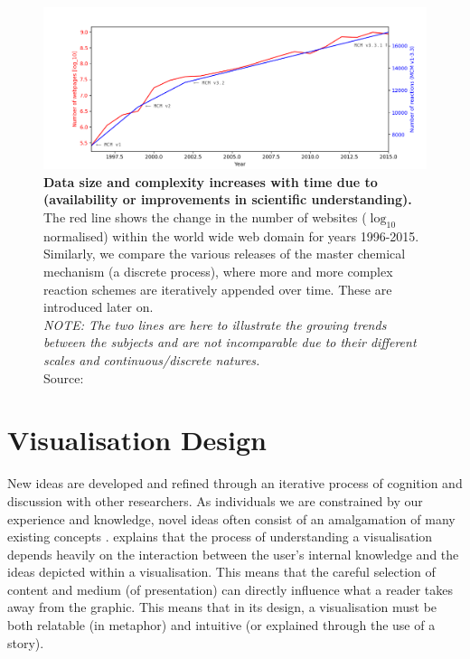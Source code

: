 \begin{figure}[H]
     \centering
         \includegraphics[width=.95\textwidth]{figures_c1/webmcm.png}
         \caption{\textbf{Data size and complexity increases with time due to (availability or improvements in scientific understanding).} The red line shows the change in the number of websites ($\log_{10}$ normalised) within the world wide web domain for years 1996-2015. Similarly, we compare the various releases of the master chemical mechanism (a discrete process), where more and more complex reaction schemes are iteratively appended over time. These are introduced later on. \\
 \emph{NOTE: The two lines are here to illustrate the growing trends between the subjects and are not incomparable due to their different scales and continuous/discrete natures.}\\ Source: \citep{webstats,mcmhist}}
         \label{fig:webmcm}
\end{figure}


\section{Visualisation Design}\label{sec:visdes}

New ideas are developed and refined through an iterative process of cognition and discussion with other researchers\citep{ch7}. As individuals we are constrained by our experience and knowledge, novel ideas often consist of an amalgamation of many existing concepts \citep{wingedhorse,goodideas}. \citep{shapinginfo} explains that the process of understanding a visualisation depends heavily on the interaction between the user's internal knowledge and the ideas depicted within a visualisation.
This means that the careful selection of content and medium (of presentation) can directly influence what a reader takes away from the graphic. This means that in its design, a visualisation must be both relatable (in metaphor) and intuitive (or explained through the use of a story).

